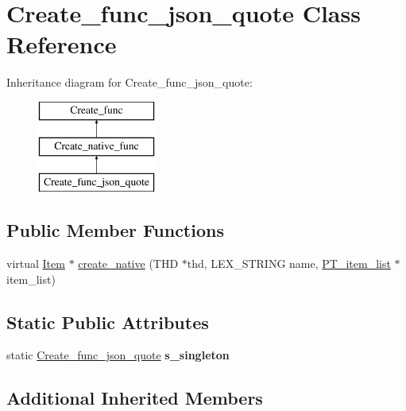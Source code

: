 \hypertarget{classCreate__func__json__quote}{}\section{Create\+\_\+func\+\_\+json\+\_\+quote Class Reference}
\label{classCreate__func__json__quote}
Inheritance diagram for Create\+\_\+func\+\_\+json\+\_\+quote\+:\begin{figure}[H]
\begin{center}
\leavevmode
\includegraphics[height=3.000000cm]{classCreate__func__json__quote}
\end{center}
\end{figure}
\subsection*{Public Member Functions}
\begin{DoxyCompactItemize}
\item 
virtual \mbox{\hyperlink{classItem}{Item}} $\ast$ \mbox{\hyperlink{classCreate__func__json__quote_a98de91127a9af27f04dbc0097a376c99}{create\+\_\+native}} (T\+HD $\ast$thd, L\+E\+X\+\_\+\+S\+T\+R\+I\+NG name, \mbox{\hyperlink{classPT__item__list}{P\+T\+\_\+item\+\_\+list}} $\ast$item\+\_\+list)
\end{DoxyCompactItemize}
\subsection*{Static Public Attributes}
\begin{DoxyCompactItemize}
\item 
\mbox{\label{classCreate__func__json__quote_a46708906b09706e2436fea771e694a29}} 
static \mbox{\hyperlink{classCreate__func__json__quote}{Create\+\_\+func\+\_\+json\+\_\+quote}} {\bfseries s\+\_\+singleton}
\end{DoxyCompactItemize}
\subsection*{Additional Inherited Members}



